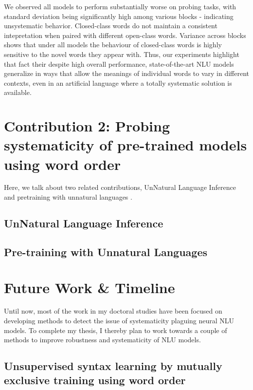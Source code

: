 \documentclass[12pt]{article}
\begin{document}
We observed all models to perform substantially worse on probing tasks, with standard deviation being significantly high among various blocks - indicating unsystematic behavior. Closed-class words do not maintain a consistent intepretation when paired with different open-class words. Variance across blocks shows that under all models the behaviour of closed-class words is highly sensitive to the novel words they appear with. Thus, our experiments highlight that fact their despite high overall performance, state-of-the-art NLU models generalize in ways that allow the meanings of individual words to vary in different contexts, even in an artificial language where a totally systematic solution is available.


\section{Contribution 2: Probing systematicity of pre-trained models using word order}
\label{sec:cont2}


Here, we talk about two related contributions, UnNatural Language Inference \cite{sinha2021} and pretraining with unnatural languages \cite{sinha2021a}.

\subsection{UnNatural Language Inference}

\subsection{Pre-training with Unnatural Languages}

\section{Future Work \& Timeline}

Until now, most of the work in my doctoral studies have been focused on developing methods to detect the issue of systematicity plaguing neural NLU models. To complete my thesis, I thereby plan to work towards a couple of methods to improve robustness and systematicity of NLU models.

\subsection{Unsupervised syntax learning by mutually exclusive training using word order}
\end{document}
